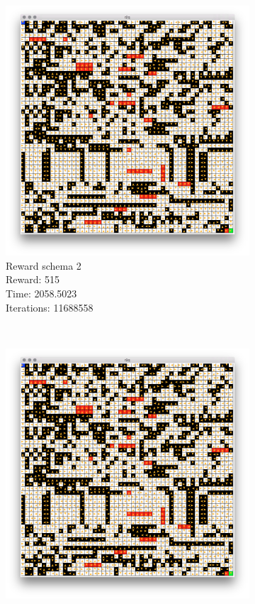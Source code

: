\documentclass[a4paper,10pt]{article}
\begin{document}
\begin{figure}[H]
\begin{subfigure}[b]{0.3\textwidth}
                \includegraphics[width=\textwidth]{figures/50x50_q_r2.png}
                \caption{Reward schema 2\\
                Reward: 515\\
                Time:  2058.5023\\
                Iterations: 11688558 }
                \label{fig:qr2}
        \end{subfigure}
        ~ %
        \begin{subfigure}[b]{0.3\textwidth}
                \includegraphics[width=\textwidth]{figures/50x50_q_r3.png}

\end{subfigure}
\end{figure}
\end{document}
